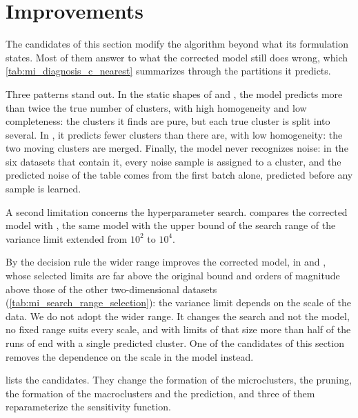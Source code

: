 \section{Improvements}
\label{sec:mi_improvements}

The candidates of this section modify the algorithm beyond what its formulation states. Most of them answer to what the corrected model still does wrong, which \cref{tab:mi_diagnosis_c_nearest} summarizes through the partitions it predicts.



Three patterns stand out. In the static shapes of \ChameleonDSThree and \ChameleonDSFour, the model predicts more than twice the true number of clusters, with high homogeneity and low completeness: the clusters it finds are pure, but each true cluster is split into several. In \BenchmarkOne, it predicts fewer clusters than there are, with low homogeneity: the two moving clusters are merged. Finally, the model never recognizes noise: in the six datasets that contain it, every noise sample is assigned to a cluster, and the predicted noise of the table comes from the first batch alone, predicted before any sample is learned.

A second limitation concerns the hyperparameter search.  compares the corrected model with , the same model with the upper bound of the search range of the variance limit extended from $10^2$ to $10^4$.




By the decision rule the wider range improves the corrected model, in \ChameleonDSThree and \ChameleonDSFour, whose selected limits are far above the original bound and orders of magnitude above those of the other two-dimensional datasets (\cref{tab:mi_search_range_selection}): the variance limit depends on the scale of the data. We do not adopt the wider range. It changes the search and not the model, no fixed range suits every scale, and with limits of that size more than half of the runs of \ChameleonDSFour end with a single predicted cluster. One of the candidates of this section removes the dependence on the scale in the model instead.

 lists the candidates. They change the formation of the microclusters, the pruning, the formation of the macroclusters and the prediction, and three of them reparameterize the sensitivity function.

